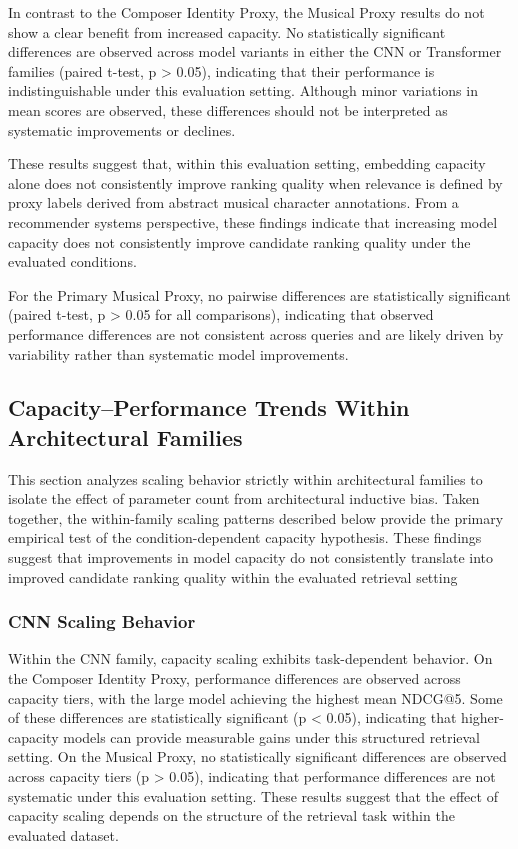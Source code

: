 \documentclass[sigconf]{acmart}
\begin{document}
In contrast to the Composer Identity Proxy, the Musical Proxy results do not show a clear benefit from increased capacity. No statistically significant differences are observed across model variants in either the CNN or Transformer families (paired t-test, p > 0.05), 
indicating that their performance is indistinguishable under this evaluation setting. 
Although minor variations in mean scores are observed, these differences should not be interpreted as systematic improvements or declines.

These results suggest that, within this evaluation setting, embedding capacity alone does not consistently improve ranking quality when relevance is defined by proxy labels derived from abstract musical character annotations. From a recommender systems perspective, these findings indicate that increasing model capacity does not consistently improve candidate ranking quality under the evaluated conditions.

For the Primary Musical Proxy, no pairwise differences are statistically significant (paired t-test, p > 0.05 for all comparisons), indicating that observed performance differences are not consistent across queries and are likely driven by variability rather than systematic model improvements.

\subsection{Capacity--Performance Trends Within Architectural Families}

This section analyzes scaling behavior strictly within architectural families to isolate the effect of parameter count from architectural inductive bias. Taken together, the within-family scaling patterns described below provide the primary empirical test of the condition-dependent capacity hypothesis. These findings suggest that improvements in model capacity do not consistently translate into improved candidate ranking quality within the evaluated retrieval setting

\subsubsection{CNN Scaling Behavior}

Within the CNN family, capacity scaling exhibits task-dependent behavior. On the Composer Identity Proxy, performance differences are observed across capacity tiers, with the large model achieving the highest mean NDCG@5. Some of these differences are statistically significant (p < 0.05), indicating that higher-capacity models can provide measurable gains under this structured retrieval setting. On the Musical Proxy, no statistically significant differences are observed across capacity tiers (p > 0.05), indicating that performance differences are not systematic under this evaluation setting. These results suggest that the effect of capacity scaling depends on the structure of the retrieval task within the evaluated dataset.
\end{document}
